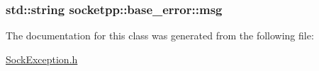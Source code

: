 \hypertarget{classsocketpp_1_1base__error_e4980949d1cd995e69cfa7cc9d110805}{
\subsubsection[{msg}]{\setlength{\rightskip}{0pt plus 5cm}std::string {\bf socketpp::base\_\-error::msg}}}
\label{classsocketpp_1_1base__error_e4980949d1cd995e69cfa7cc9d110805}




The documentation for this class was generated from the following file:\begin{CompactItemize}
\item 
\hyperlink{SockException_8h}{SockException.h}\end{CompactItemize}
